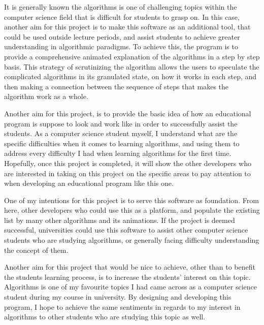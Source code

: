 It is generally known the algorithms is one of challenging topics within the computer science field that is difficult for students to grasp on. In this case, another aim for this project is to make this software as an additional tool, that could be used outside lecture periods, and assist students to achieve greater understanding in algorithmic paradigms. To achieve this, the program is to provide a comprehensive animated explanation of the algorithms in a step by step basis. 
This strategy of scrutinizing the algorithm allows the users to speculate the complicated algorithms in its granulated state, on how it works in each step, and then making a connection between the sequence of steps that makes the algorithm work as a whole.

Another aim for this project, is to provide the basic idea of how an educational program is suppose to look and work like in order to successfully assist the students. As a computer science student myself, I understand what are the specific difficulties when it comes to learning algorithms, and using them to address every difficulty I had when learning algorithms for the first time. Hopefully, once this project is completed, it will show the other developers who are interested in taking on this project on the specific areas to pay attention to when developing an educational program like this one. 

One of my intentions for this project is to serve this software as foundation. From here, other developers who could use this as a platform, and populate the existing list by many other algorithms and its animations. If the project is deemed successful, universities could use this software to assist other computer science students who are studying algorithms, or generally facing difficulty understanding the concept of them.

Another aim for this project that would be nice to achieve, other than to benefit the students learning process, is to increase the students' interest on this topic. Algorithms is one of my favourite topics I had came across as a computer science student during my course in university. By designing and developing this program, I hope to achieve the same sentiments in regards to my interest in algorithms to other students who are studying this topic as well.

